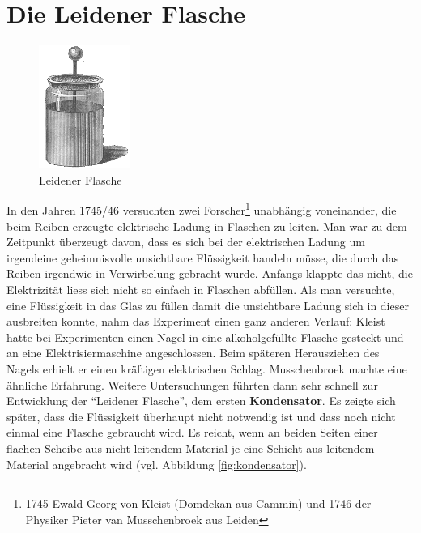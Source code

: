 \documentclass[11pt,twoside=false,open=any]{scrbook}
\begin{document}
\section{Die Leidener Flasche}
\begin{figure}
\includegraphics[width=3cm]{leidener.png}
	\caption{Leidener Flasche}
	\label{fig:leidener}
\end{figure}
In den Jahren 1745/46 versuchten zwei Forscher\footnote{1745 Ewald Georg von Kleist (Domdekan aus Cammin) und 1746 der Physiker Pieter van Musschenbroek aus Leiden} unabhängig voneinander, die beim Reiben erzeugte elektrische Ladung in Flaschen zu leiten. Man war zu dem Zeitpunkt überzeugt davon, dass es sich bei der elektrischen Ladung um irgendeine geheimnisvolle unsichtbare Flüssigkeit handeln müsse, die durch das Reiben irgendwie in Verwirbelung gebracht wurde. Anfangs klappte das nicht, die Elektrizität liess sich nicht so einfach in Flaschen abfüllen. Als man versuchte, eine Flüssigkeit in das Glas zu füllen damit die unsichtbare Ladung sich in dieser ausbreiten konnte, nahm das Experiment einen ganz anderen Verlauf: Kleist hatte bei Experimenten einen Nagel in eine alkoholgefüllte Flasche gesteckt und an eine Elektrisiermaschine angeschlossen. Beim späteren Herausziehen des Nagels erhielt er einen kräftigen elektrischen Schlag. Musschenbroek machte eine ähnliche Erfahrung.
Weitere Untersuchungen führten dann sehr schnell zur Entwicklung der ``Leidener Flasche'', dem ersten \textbf{Kondensator}. Es zeigte sich später, dass die Flüssigkeit überhaupt nicht notwendig ist und dass noch nicht einmal eine Flasche gebraucht wird. Es reicht, wenn an beiden Seiten einer flachen Scheibe aus nicht leitendem Material je eine Schicht aus leitendem Material angebracht wird (vgl. Abbildung \ref{fig:kondensator}).

\begin{center}
   \setlength{\fboxrule}{2pt}
\end{center}
\end{document}
